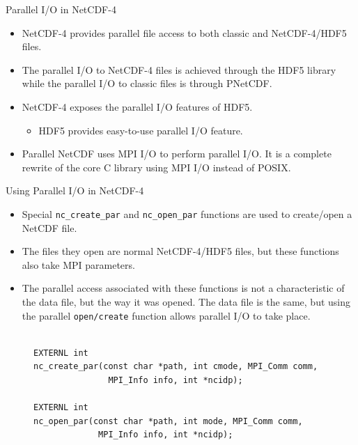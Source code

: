 \documentclass[compress,11pt,xcolor=svgnames,aspectratio=169]{beamer}
\begin{document}
\begin{frame}[fragile]{Parallel I/O in NetCDF-4}

\begin{itemize}
\setlength\itemsep{0.6cm}

  \item NetCDF-4 provides parallel file access to both classic and NetCDF-4/HDF5 files.

  \item The parallel I/O to NetCDF-4 files is achieved through the HDF5 library while the parallel I/O to classic files is through PNetCDF.

  \item NetCDF-4 exposes the parallel I/O features of HDF5.
    \begin{itemize}
    \item HDF5 provides easy-to-use parallel I/O feature.
    \end{itemize}

  \item Parallel NetCDF uses MPI I/O to perform parallel I/O. It is a complete rewrite of the core C library using MPI I/O instead of POSIX.

\end{itemize}

\end{frame}

\begin{frame}[fragile]{Using Parallel I/O in NetCDF-4}

\begin{itemize}
\setlength\itemsep{0.4cm}

  \item Special \verb|nc_create_par| and \verb|nc_open_par| functions are used to create/open a NetCDF file.

  \item The files they open are normal NetCDF-4/HDF5 files, but these functions also take MPI parameters.

  \item The parallel access associated with these functions is not a characteristic of the data file, but the way it was opened. The data file is the same, but using the parallel \verb|open/create| function allows parallel I/O to take place.

\end{itemize}

\begin{figure}
\centering
\begin{varwidth}{\linewidth}
{ \tiny

\begin{verbatim}

EXTERNL int
nc_create_par(const char *path, int cmode, MPI_Comm comm,
               MPI_Info info, int *ncidp);

EXTERNL int
nc_open_par(const char *path, int mode, MPI_Comm comm,
             MPI_Info info, int *ncidp);

\end{verbatim}

}
\end{varwidth}
\end{figure}

\end{frame}
\end{document}
